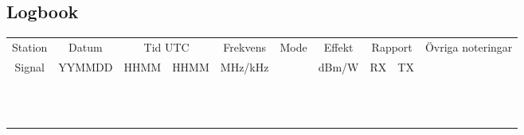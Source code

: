\pagestyle{empty}
\begin{landscape}
\section{Logbook}
\begin{longtable}{|c|c|c|c|c|c|c|c|c|c|}
	\hline
	Station  & Datum  & \multicolumn{2}{|c|}{Tid UTC} & Frekvens & Mode & Effekt & \multicolumn{2}{|c|}{Rapport} & Övriga noteringar\hspace{25cm}\\
	 Signal  & YYMMDD & HHMM &          HHMM          & MHz/kHz  &      & dBm/W  & RX &            TX            &  \\ \hline
	\endhead &        &      &                        &          &      &        &    &                          &  \\ \hline
	         &        &      &                        &          &      &        &    &                          &  \\ \hline
	         &        &      &                        &          &      &        &    &                          &  \\ \hline
	         &        &      &                        &          &      &        &    &                          &  \\ \hline
	         &        &      &                        &          &      &        &    &                          &  \\ \hline
	         &        &      &                        &          &      &        &    &                          &  \\ \hline
	         &        &      &                        &          &      &        &    &                          &  \\ \hline
	         &        &      &                        &          &      &        &    &                          &  \\ \hline
	         &        &      &                        &          &      &        &    &                          &  \\ \hline
	         &        &      &                        &          &      &        &    &                          &  \\ \hline
	         &        &      &                        &          &      &        &    &                          &  \\ \hline
	         &        &      &                        &          &      &        &    &                          &  \\ \hline

\end{longtable}
\end{landscape}
